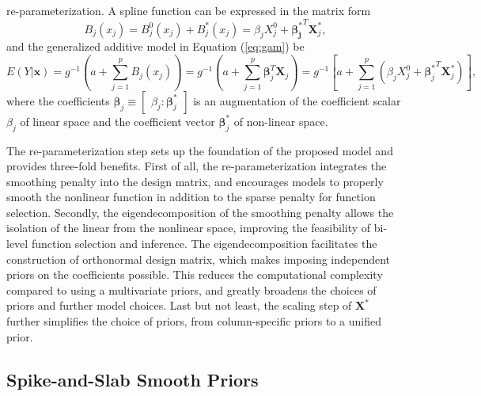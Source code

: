 \documentclass[AMA,STIX1COL,]{WileyNJD-v2}
\begin{document}
re-parameterization. A spline function can be expressed in the matrix
form \[
B_j(x_j) = B_j^0(x_j) + B_j^*(x_j) = \beta_j X^0_j + \boldsymbol{\beta_j^*}^T \boldsymbol{X}_j^*,
\] and the generalized additive model in Equation (\ref{eq:gam}) be
\begin{equation}\label{eq:gam-repa}
E(Y|\boldsymbol{x}) = g^{-1}(a + \sum\limits^p_{j=1} B_j(x_j)) = g^{-1}(a + \sum\limits^p_{j=1} \boldsymbol{\beta}_j^T \boldsymbol{X}_j) = g^{-1}\left[a + \sum\limits^p_{j=1} (\beta_j X^0_j + {\boldsymbol{\beta}_j^*}^T \boldsymbol{X}_j^*)\right],
\end{equation} where the coefficients
\(\boldsymbol{\beta}_j \equiv \begin{bmatrix} \beta_j : \boldsymbol{\beta}^*_j \end{bmatrix}\)
is an augmentation of the coefficient scalar \(\beta_j\) of linear space
and the coefficient vector \(\boldsymbol{\beta}^*_j\) of non-linear
space.

The re-parameterization step sets up the foundation of the proposed
model and provides three-fold benefits. First of all, the
re-parameterization integrates the smoothing penalty into the design
matrix, and encourages models to properly smooth the nonlinear function
in addition to the sparse penalty for function selection. Secondly, the
eigendecomposition of the smoothing penalty allows the isolation of the
linear from the nonlinear space, improving the feasibility of bi-level
function selection and inference. The eigendecomposition facilitates the
construction of orthonormal design matrix, which makes imposing
independent priors on the coefficients possible. This reduces the
computational complexity compared to using a multivariate priors, and
greatly broadens the choices of priors and further model choices. Last
but not least, the scaling step of \(\boldsymbol{X}^*\) further
simplifies the choice of priors, from column-specific priors to a
unified prior.

\hypertarget{spike-and-slab-smooth-priors}{%
\subsection{Spike-and-Slab Smooth
Priors}\label{spike-and-slab-smooth-priors}}
\end{document}
